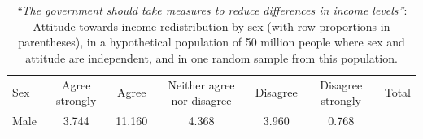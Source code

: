 \documentclass[11pt,a4paper,openany]{book}
\begin{document}
\begin{longtable}[]{@{}lcccccr@{}}
\caption{\label{tab:t-sex-attitude-H0pop} \emph{``The government should take
measures to reduce differences in income levels''}: Attitude towards
income redistribution by sex (with row proportions in parentheses), in a
hypothetical population of 50 million people where sex and attitude are
independent, and in one random sample from this
population.}\tabularnewline
\toprule
\begin{minipage}[t]{0.05\columnwidth}\raggedright\strut
Sex\strut
\end{minipage} & \begin{minipage}[t]{0.42\columnwidth}\centering\strut
Agree strongly\strut
\end{minipage} & \begin{minipage}[t]{0.06\columnwidth}\centering\strut
Agree\strut
\end{minipage} & \begin{minipage}[t]{0.09\columnwidth}\centering\strut
Neither agree nor disagree\strut
\end{minipage} & \begin{minipage}[t]{0.06\columnwidth}\centering\strut
Disagree\strut
\end{minipage} & \begin{minipage}[t]{0.06\columnwidth}\centering\strut
Disagree strongly\strut
\end{minipage} & \begin{minipage}[t]{0.04\columnwidth}\raggedleft\strut
Total\strut
\end{minipage}\tabularnewline
\begin{minipage}[t]{0.05\columnwidth}\raggedright\strut
Male\strut
\end{minipage} & \begin{minipage}[t]{0.42\columnwidth}\centering\strut
3.744\strut
\end{minipage} & \begin{minipage}[t]{0.06\columnwidth}\centering\strut
11.160\strut
\end{minipage} & \begin{minipage}[t]{0.09\columnwidth}\centering\strut
4.368\strut
\end{minipage} & \begin{minipage}[t]{0.06\columnwidth}\centering\strut
3.960\strut
\end{minipage} & \begin{minipage}[t]{0.06\columnwidth}\centering\strut
0.768\strut
\end{minipage} & \begin{minipage}[t]{0.04\columnwidth}\raggedleft\strut

\end{minipage}
\end{longtable}
\end{document}
